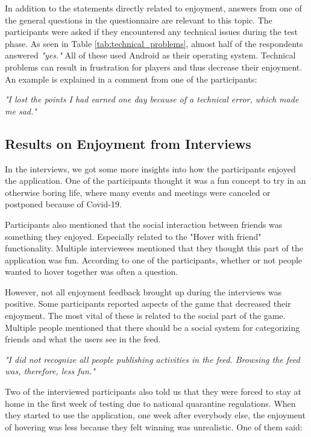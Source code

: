In addition to the statements directly related to enjoyment, answers from one of the general questions in the questionnaire are relevant to this topic. The participants were asked if they encountered any technical issues during the test phase. As seen in Table \ref{tab:technical_problems}, almost half of the respondents answered \textit{"yes."} All of these used Android as their operating system. Technical problems can result in frustration for players and thus decrease their enjoyment. An example is explained in a comment from one of the participants:

\textit{"I lost the points I had earned one day because of a technical error, which made me sad."\footnotemark[\value{footnote}]}

\subsection{Results on Enjoyment from Interviews}
In the interviews, we got some more insights into how the participants enjoyed the application. One of the participants thought it was a fun concept to try in an otherwise boring life, where many events and meetings were canceled or postponed because of Covid-19.

Participants also mentioned that the social interaction between friends was something they enjoyed. Especially related to the "Hover with friend" functionality. Multiple interviewees mentioned that they thought this part of the application was fun. According to one of the participants, whether or not people wanted to hover together was often a question.

However, not all enjoyment feedback brought up during the interviews was positive. Some participants reported aspects of the game that decreased their enjoyment. The most vital of these is related to the social part of the game. Multiple people mentioned that there should be a social system for categorizing friends and what the users see in the feed.

\textit{"I did not recognize all people publishing activities in the feed. Browsing the feed was, therefore, less fun." \footnotemark[\value{footnote}]}

Two of the interviewed participants also told us that they were forced to stay at home in the first week of testing due to national quarantine regulations. When they started to use the application, one week after everybody else, the enjoyment of hovering was less because they felt winning was unrealistic. One of them said:

